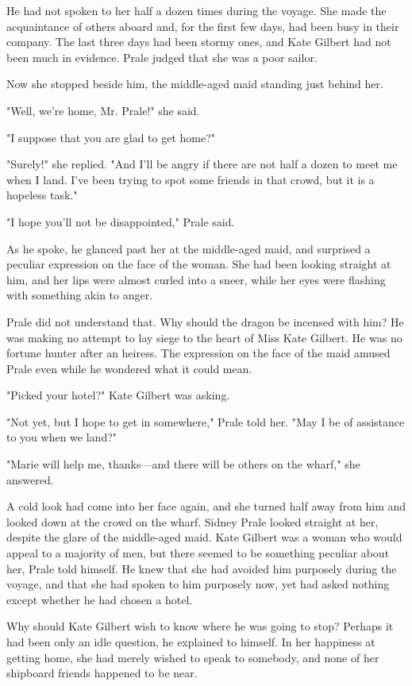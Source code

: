 \documentclass{novel}
\begin{document}
He had not spoken to her half a dozen times during the voyage. She made the acquaintance of others aboard and, for the first few days, had been busy in their company. The last three days had been stormy ones, and Kate Gilbert had not been much in evidence. Prale judged that she was a poor sailor.

Now she stopped beside him, the middle-aged maid standing just behind her.

"Well, we're home, Mr. Prale!" she said.

"I suppose that you are glad to get home?"

"Surely!" she replied. "And I'll be angry if there are not half a dozen to meet me when I land. I've been trying to spot some friends in that crowd, but it is a hopeless task."

"I hope you'll not be disappointed," Prale said.

As he spoke, he glanced past her at the middle-aged maid, and surprised a peculiar expression on the face of the woman. She had been looking straight at him, and her lips were almost curled into a sneer, while her eyes were flashing with something akin to anger.

Prale did not understand that. Why should the dragon be incensed with him? He was making no attempt to lay siege to the heart of Miss Kate Gilbert. He was no fortune hunter after an heiress. The expression on the face of the maid amused Prale even while he wondered what it could mean.

"Picked your hotel?" Kate Gilbert was asking.

"Not yet, but I hope to get in somewhere," Prale told her. "May I be of assistance to you when we land?"

"Marie will help me, thanks---and there will be others on the wharf," she answered.

A cold look had come into her face again, and she turned half away from him and looked down at the crowd on the wharf. Sidney Prale looked straight at her, despite the glare of the middle-aged maid. Kate Gilbert was a woman who would appeal to a majority of men, but there seemed to be something peculiar about her, Prale told himself. He knew that she had avoided him purposely during the voyage, and that she had spoken to him purposely now, yet had asked nothing except whether he had chosen a hotel.

Why should Kate Gilbert wish to know where he was going to stop? Perhaps it had been only an idle question, he explained to himself. In her happiness at getting home, she had merely wished to speak to somebody, and none of her shipboard friends happened to be near.
\end{document}

